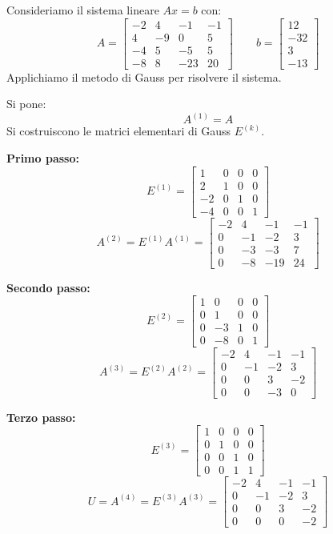 \begin{example}
Consideriamo il sistema lineare $Ax = b$ con:
\[
A =
\begin{bmatrix}
-2 & 4 & -1 & -1 \\
4 & -9 & 0 & 5 \\
-4 & 5 & -5 & 5 \\
-8 & 8 & -23 & 20
\end{bmatrix}
\qquad
b =
\begin{bmatrix}
12 \\
-32 \\
3 \\
-13
\end{bmatrix}
\]
Applichiamo il metodo di Gauss per risolvere il sistema.

Si pone:
\[
A^{(1)} = A
\]
Si costruiscono le matrici elementari di Gauss $E^{(k)}$.

\bigskip

\textbf{Primo passo:}
\[
E^{(1)} =
\begin{bmatrix}
1 & 0 & 0 & 0 \\
2 & 1 & 0 & 0 \\
-2 & 0 & 1 & 0 \\
-4 & 0 & 0 & 1
\end{bmatrix}
\]
\[
A^{(2)} = E^{(1)} A^{(1)} =
\begin{bmatrix}
-2 & 4 & -1 & -1 \\
0 & -1 & -2 & 3 \\
0 & -3 & -3 & 7 \\
0 & -8 & -19 & 24
\end{bmatrix}
\]

\textbf{Secondo passo:}
\[
E^{(2)} =
\begin{bmatrix}
1 & 0 & 0 & 0 \\
0 & 1 & 0 & 0 \\
0 & -3 & 1 & 0 \\
0 & -8 & 0 & 1
\end{bmatrix}
\]
\[
A^{(3)} = E^{(2)} A^{(2)} =
\begin{bmatrix}
-2 & 4 & -1 & -1 \\
0 & -1 & -2 & 3 \\
0 & 0 & 3 & -2 \\
0 & 0 & -3 & 0
\end{bmatrix}
\]

\textbf{Terzo passo:}
\[
E^{(3)} =
\begin{bmatrix}
1 & 0 & 0 & 0 \\
0 & 1 & 0 & 0 \\
0 & 0 & 1 & 0 \\
0 & 0 & 1 & 1
\end{bmatrix}
\]
\[
U = A^{(4)} = E^{(3)} A^{(3)} =
\begin{bmatrix}
-2 & 4 & -1 & -1 \\
0 & -1 & -2 & 3 \\
0 & 0 & 3 & -2 \\
0 & 0 & 0 & -2
\end{bmatrix}
\]


\end{example}

